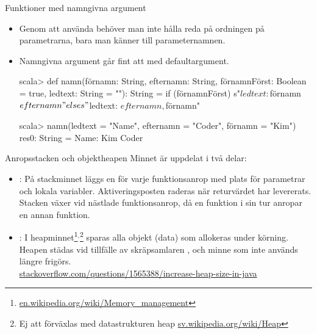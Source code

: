 \begin{Slide}{Funktioner med namngivna argument}
\begin{itemize}
\item Genom att använda  behöver man inte hålla reda på ordningen på parametrarna, bara man känner till parameternamnen.
\item Namngivna argument går fint att  med defaultargument.
\begin{REPL}
scala> def namn(förnamn: String,
                efternamn: String,
                förnamnFörst: Boolean = true,
                ledtext: String = ""): String =
         if (förnamnFörst) s"$ledtext: $förnamn $efternamn"
         else s"$ledtext: $efternamn, $förnamn"

scala> namn(ledtext = "Name", efternamn = "Coder", förnamn = "Kim")
res0: String = Name: Kim Coder
\end{REPL}
\end{itemize}
\end{Slide}


\begin{Slide}{Anropsstacken och objektheapen}\SlideFontSmall
Minnet är uppdelat i två delar:
\begin{itemize}
\item {}: På stackminnet läggs en   för varje funktionsanrop med plats för parametrar och lokala variabler. Aktiveringsposten raderas när returvärdet har levererats. Stacken växer vid nästlade funktionsanrop, då en funktion i sin tur anropar en annan funktion.

\item {}: I heapminnet\footnote{\href{https://en.wikipedia.org/wiki/Memory_management}{en.wikipedia.org/wiki/Memory\_management}}$^{,}$\footnote{Ej att förväxlas med datastrukturen heap  \href{https://sv.wikipedia.org/wiki/Heap}{sv.wikipedia.org/wiki/Heap}} sparas alla objekt (data) som allokeras under körning. Heapen städas vid tillfälle av skräpsamlaren , och minne som inte används längre frigörs. \\\vspace{0.5em}
\href{http://stackoverflow.com/questions/1565388/increase-heap-size-in-java}{stackoverflow.com/questions/1565388/increase-heap-size-in-java}
\end{itemize}
\end{Slide}


